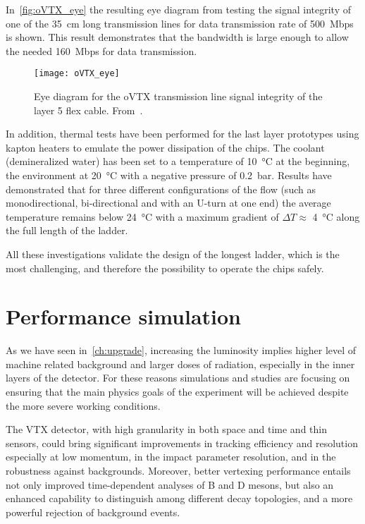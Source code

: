 In~\autoref{fig:oVTX_eye} the resulting eye diagram from testing the signal integrity of one of the \SI{35}{cm} long transmission lines for data transmission rate of \SI{500}{Mbps} is shown. This result demonstrates that the bandwidth is large enough to allow the needed \SI{160}{Mbps} for data transmission.


\begin{figure}[h!]
\centering
\texttt{[image: oVTX\_eye]}
\caption{Eye diagram for the oVTX transmission line signal integrity of the layer 5 flex cable. From~\cite{BelleIIVTX:2023szr}.}
\label{fig:oVTX_eye}
\end{figure}


In addition, thermal tests have been performed for the last layer prototypes using kapton heaters to emulate the power dissipation of the chips. The coolant (demineralized water) has been set to a temperature of \SI{10}{\degreeCelsius} at the beginning, the environment at \SI{20}{\degreeCelsius} with a negative pressure of \SI{0.2}{bar}. Results have demonstrated that for three different configurations of the flow (such as monodirectional, bi-directional and with an U-turn at one end) the average temperature remains below \SI{24}{\degreeCelsius} with a maximum gradient of $\Delta T \approx$ \SI{4}{\degreeCelsius} along the full length of the ladder. 

All these investigations validate the design of the longest ladder, which is the most challenging, and therefore the possibility to operate the chips safely.


\section{Performance simulation}


As we have seen in~\autoref{ch:upgrade}, increasing the luminosity implies higher level of machine related background and larger doses of radiation, especially in the inner layers of the detector. 
For these reasons simulations and studies are focusing on ensuring that the main physics goals of the experiment will be achieved despite the more severe working conditions. 

The VTX detector, with high granularity in both space and time and thin sensors, could bring significant improvements in tracking efficiency and resolution especially at low momentum, in the impact parameter resolution, and in the robustness against backgrounds. Moreover, better vertexing performance entails not only improved time-dependent analyses of B and D mesons, but also an enhanced capability to distinguish among different decay topologies, and a more powerful rejection of background events.


